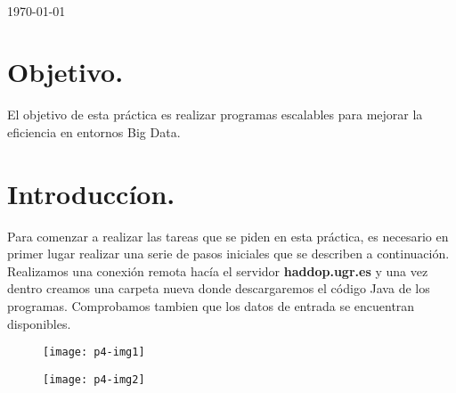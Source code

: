 \documentclass[10pt]{article}
\begin{document}
\begin{center}
 		\\																		%
\vspace{2cm} 																				
\begin{center}																					
{\large \today}																	%
 			\end{center}												  						
\end{center}							 											
																					
\newpage																		

\tableofcontents 

\newpage

\section{Objetivo.}
El objetivo de esta práctica es realizar programas escalables para mejorar la eficiencia en entornos Big Data.\\


\section{Introduccíon.}
Para comenzar a realizar las tareas  que se piden en esta práctica, es necesario en primer lugar realizar una serie de pasos iniciales que se describen a continuación. \\

Realizamos una conexión remota hacía el servidor \textbf{haddop.ugr.es} y una vez dentro creamos una carpeta nueva donde descargaremos el código Java de los programas. Comprobamos tambien que los datos de entrada se encuentran disponibles.\\

 \begin{figure}[H]
	\begin{center}
 		\texttt{[image: p4-img1]}
	\end{center} 
\end{figure}

 \begin{figure}[H]
	\begin{center}
 		\texttt{[image: p4-img2]}
	\end{center} 
\end{figure}
\end{document}

